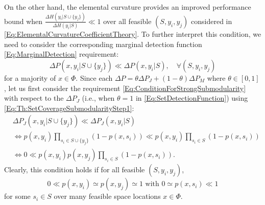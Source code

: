 \documentclass[letterpaper, 10 pt, conference]{ieeeconf}
\begin{document}
On the other hand, the elemental curvature provides an improved performance bound when $\frac{\Delta H(y_i \vert S \cup \{y_j\})}{\Delta H(y_i \vert S)} \ll 1$ over all feasible $(S,y_i,y_j)$ considered in \eqref{Eq:ElementalCurvatureCoefficientTheory}. To further interpret this condition, we need to consider the corresponding marginal detection function \eqref{Eq:MarginalDetection} requirement:
\begin{equation}\label{Eq:ConditionForStrongSubmodularity}
\Delta P(x,y_i \vert S \cup \{y_j\}) \ll \Delta P(x, y_i \vert S), \quad \forall (S,y_i,y_j)    
\end{equation}
for a majority of $x\in\Phi$. Since each $\Delta P = \theta \Delta P_J + (1-\theta)\Delta P_M$ where $\theta \in [0,1]$, let us first consider the requirement \eqref{Eq:ConditionForStrongSubmodularity} with respect to the $\Delta P_J$ (i.e., when $\theta = 1$ in \eqref{Eq:SetDetectionFunction}) using \eqref{Eq:Th:SetCoverageSubmodularityStep1}:
\begin{align}
    &\Delta P_J(x,y_i \vert S \cup \{y_j\}) \ll \Delta P_J(x, y_i \vert S) \nonumber\\
    &\iff p(x,y_i)\prod_{s_i\in S\cup\{y_j\}}(1-p(x,s_i))\ll 
    p(x,y_i)\prod_{s_i\in S}(1-p(x,s_i))\nonumber\\
    &\iff 0 \ll p(x,y_i)p(x,y_j)\prod_{s_i\in S}(1-p(x,s_i)). \nonumber
\end{align}
Clearly, this condition holds if for all feasible $(S,y_i,y_j)$, 
\begin{equation}\label{Eq:ConditionForStrongSubmodularity1}
    0 \ll p(x,y_i) \simeq p(x,y_j) \simeq 1 \mbox{ with } 0 \simeq p(x,s_i) \ll 1
\end{equation}
for some $s_i\in S$ over many feasible space locations $x\in\Phi$.
\end{document}

